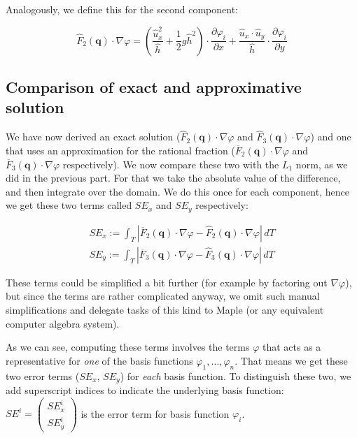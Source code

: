 \documentclass{article}
\newcommand{\pd}[2]{\dfrac{\partial #1}{\partial #2}}
\renewcommand{\phi}{\varphi}
\begin{document}
Analogously, we define this for the second component:

\begin{equation}
  \label{eq:stiffness-analysis-second-line-exact-approx-simple}
  \widehat{F}_2(\mathbf{q}) \cdot \nabla \phi =
  \left( \frac{\widehat{u}_x^2}{\widehat{h}} + \frac{1}{2} g \widehat{h}^2 \right) \cdot \pd{\phi_i}{x} +
  \frac{\widehat{u}_x \cdot \widehat{u}_y }{\widehat{h}} \cdot \pd{\phi_i}{y}
\end{equation}

\subsection{Comparison of exact and approximative solution}

We have now derived an exact solution ($\widehat{F}_2(\mathbf{q}) \cdot \nabla \phi$ and $\widehat{F}_3(\mathbf{q}) \cdot \nabla \phi$) and one that uses an approximation for the rational fraction ($\overline{F}_2(\mathbf{q}) \cdot \nabla \phi$ and $\overline{F}_3(\mathbf{q}) \cdot \nabla \phi$ respectively). We now compare these two with the $L_1$ norm, as we did in the previous part. For that we take the absolute value of the difference, and then integrate over the domain. We do this once for each component, hence we get these two terms called $SE_x$ and $SE_y$ respectively:

\begin{eqnarray*}
  SE_x := \int_T \left| \overline{F}_2(\mathbf{q}) \cdot \nabla \phi - \widehat{F}_2(\mathbf{q}) \cdot \nabla \phi \right| \, dT\\
  SE_y := \int_T \left| \overline{F}_3(\mathbf{q}) \cdot \nabla \phi - \widehat{F}_3(\mathbf{q}) \cdot \nabla \phi \right| \, dT
\end{eqnarray*}

These terms could be simplified a bit further (for example by factoring out $\nabla \phi$), but since the terms are rather complicated anyway, we omit such manual simplifications and delegate tasks of this kind to Maple (or any equivalent computer algebra system).

As we can see, computing these terms involves the terms $\phi$ that acts as a representative for \emph{one} of the basis functions $\phi_1,\dots,\phi_n$. That means we get these two error terms ($SE_x$, $SE_y$) for \emph{each} basis function. To distinguish these two, we add superscript indices to indicate the underlying basis function: $SE^i=
\begin{pmatrix}
  SE_x^i \\ SE_y^i
\end{pmatrix}$ is the error term for basis function $\phi_i$.
\end{document}
